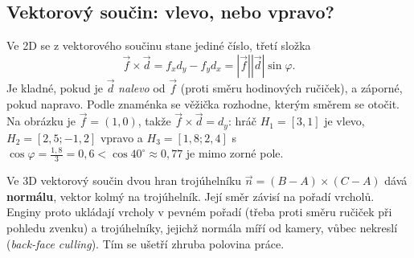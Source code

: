 \begin{center}
\end{center}

\subsection{Vektorový součin: vlevo, nebo vpravo?}

Ve 2D se z vektorového součinu stane jediné číslo, třetí složka
\begin{equation*}
  \vec{f}\times\vec{d} = f_xd_y - f_yd_x = |\vec{f}||\vec{d}|\sin\varphi.
\end{equation*}
Je kladné, pokud je $\vec{d}$ \textit{nalevo} od $\vec{f}$ (proti směru hodinových ručiček), a záporné, pokud napravo. Podle znaménka se věžička rozhodne, kterým směrem se otočit. Na obrázku je $\vec{f} = (1, 0)$, takže $\vec{f}\times\vec{d} = d_y$: hráč $H_1 = [3, 1]$ je vlevo, $H_2 = [2{,}5; -1{,}2]$ vpravo a $H_3 = [1{,}8; 2{,}4]$ s $\cos\varphi = \frac{1{,}8}{3} = 0{,}6 < \cos 40^\circ\approx 0{,}77$ je mimo zorné pole.

Ve 3D vektorový součin dvou hran trojúhelníku $\vec{n} = (B - A)\times(C - A)$ dává \textbf{normálu}, vektor kolmý na trojúhelník. Její směr závisí na pořadí vrcholů. Enginy proto ukládají vrcholy v pevném pořadí (třeba proti směru ručiček při pohledu zvenku) a trojúhelníky, jejichž normála míří od kamery, vůbec nekreslí (\textit{back-face culling}). Tím se ušetří zhruba polovina práce.

